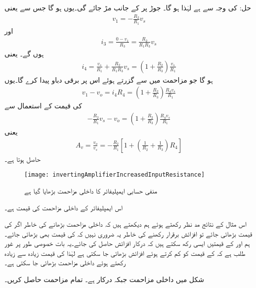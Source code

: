 حل:
 کی وجہ سے  ہے لہٰذا  ہو گا۔ جوڑ  پر  کے جانب مڑ جائے گی۔یوں  ہو گا جس سے  یعنی
\begin{align*}
v_1=-\frac{R_2}{R_1} v_s
\end{align*}
اور
\begin{align*}
i_3=\frac{0-v_1}{R_3}=\frac{R_2}{R_1 R_3} v_s
\end{align*}
ہوں گے۔ یعنی
\begin{align*}
i_4=\frac{v_s}{R_1}+\frac{R_2}{R_1 R_3} v_s=\left(1+\frac{R_2}{R_3} \right) \frac{v_s}{R_1}
\end{align*}
ہو گا جو مزاحمت  میں سے گزرتے ہوئے اس پر  برقی دباو پیدا کرے گا۔یوں
\begin{align*}
v_1-v_o=i_4 R_4=\left(1+\frac{R_2}{R_3} \right) \frac{R_4 v_s}{R_1}
\end{align*}
 کی قیمت کے استعمال سے
\begin{align*}
-\frac{R_2}{R_1} v_s-v_o=\left(1+\frac{R_2}{R_3} \right) \frac{R_4 v_s}{R_1}
\end{align*}
یعنی
\begin{align} \label{مساوات_حسابی_داخلی_مزاحمت_بڑھایا_گیا}
A_v=\frac{v_o}{v_s}=-\frac{R_2}{R_1}\left[1+\left(\frac{1}{R_2}+\frac{1}{R_3} \right)R_4 \right]
\end{align}
حاصل ہوتا ہے۔

\begin{figure}
\centering
\texttt{[image: invertingAmplifierIncreasedInputResistance]}
\caption{منفی حسابی ایمپلیفائر کا داخلی مزاحمت بڑھایا گیا ہے}
\label{شکل_حسابی_منفی_داخلی_زیادہ_مزاحمت}
\end{figure}

اس ایمپلیفائر کے داخلی مزاحمت کی قیمت  ہے۔

اس مثال کے نتائج مد نظر رکھتے ہوئے ہم دیکھتے ہیں کہ داخلی مزاحمت بڑھانے کی خاطر اگر  کی قیمت بڑھائی جائے تو افزائش برقرار رکھنے کی خاطر یہ ضروری نہیں کہ   کی قیمت بھی بڑھائی جائے۔ہم   اور  کے قیمتیں ایسی رکھ سکتے ہیں کہ درکار افزائش حاصل کی جائے۔یہ بات خصوصی  طور پر غور طلب ہے کہ  کے قیمت کو کم کرتے ہوئے افزائش بڑھائی جا سکتی ہے لہٰذا  کی قیمت زیادہ سے زیادہ رکھتے ہوئے داخلی مزاحمت بڑھائی جا سکتی ہے۔ 

شکل  میں داخلی مزاحمت  جبکہ  درکار ہے۔ تمام مزاحمت حاصل کریں۔

